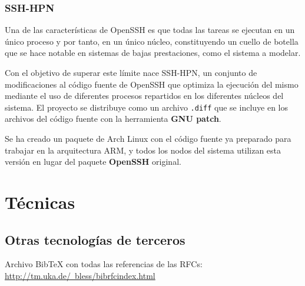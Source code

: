 \subsection{SSH-HPN}

Una de las características de OpenSSH es que todas las tareas se ejecutan en un único proceso y por tanto, en un único núcleo, constituyendo un cuello de botella que se hace notable en sistemas de bajas prestaciones, como el sistema a modelar.

Con el objetivo de superar este límite nace SSH-HPN\citationneeded, un conjunto de modificaciones al código fuente de OpenSSH que optimiza la ejecución del mismo mediante el uso de diferentes procesos repartidos en los diferentes núcleos del sistema. El proyecto se distribuye como un archivo \texttt{.diff} que se incluye en los archivos del código fuente con la herramienta \textbf{GNU patch}.

Se ha creado un paquete de Arch Linux con el código fuente ya preparado para trabajar en la arquitectura ARM, y todos los nodos del sistema utilizan esta versión en lugar del paquete \textbf{OpenSSH} original.

\chapter{Técnicas}

\section{Otras tecnologías de terceros}

Archivo BibTeX con todas las referencias de las RFCs: \href{http://tm.uka.de/~bless/bibrfcindex.html}{http://tm.uka.de/~bless/bibrfcindex.html}